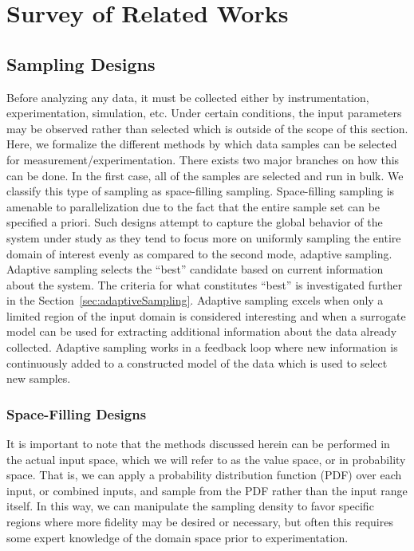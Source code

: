 
\chapter{Survey of Related Works}
\label{ch:related}
\section{Sampling Designs}
\label{sec:sampling}

Before analyzing any data, it must be collected either by instrumentation, experimentation, simulation, etc.
%
Under certain conditions, the input parameters may be observed rather than selected which is outside of the scope of this section.
%
Here, we formalize the different methods by which data samples can be selected for measurement/experimentation.
%
There exists two major branches on how this can be done.
%
In the first case, all of the samples are selected and run in bulk.
%
We classify this type of sampling as space-filling sampling.
%
Space-filling sampling is amenable to parallelization due to the fact that the entire sample set can be specified a priori.
%
Such designs attempt to capture the global behavior of the system under study as they tend to focus more on uniformly sampling the entire domain of interest evenly as compared to the second mode, adaptive sampling.
%
Adaptive sampling selects the ``best'' candidate based on current information about the system.
%
The criteria for what constitutes ``best'' is investigated further in the Section~\ref{sec:adaptiveSampling}.
%
Adaptive sampling excels when only a limited region of the input domain is considered interesting and when a surrogate model can be used for extracting additional information about the data already collected.
%
Adaptive sampling works in a feedback loop where new information is continuously added to a constructed model of the data which is used to select new samples.

\subsection{Space-Filling Designs}
\label{sec:forwardSampling}

It is important to note that the methods discussed herein can be performed in the actual input space, which we will refer to as the value space, or in probability space.
%
That is, we can apply a probability distribution function (PDF) over each input, or combined inputs, and sample from the PDF rather than the input range itself.
%
In this way, we can manipulate the sampling density to favor specific regions where more fidelity may be desired or necessary, but often this requires some expert knowledge of the domain space prior to experimentation.

